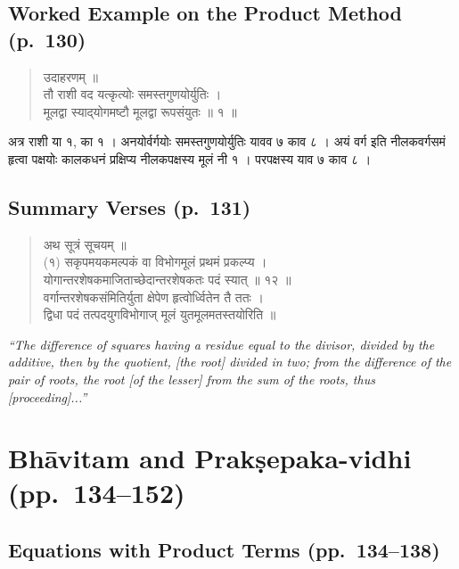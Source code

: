 \documentclass[11pt,a4paper]{article}
\newcommand{\cnote}[1]{\textcolor{notecolor}{\textit{#1}}}
\newcommand{\dev}[1]{{\devanagarifont #1}}
\newenvironment{sanskritverse}{%
  \begin{quote}
}{%
  \end{quote}
}
\begin{document}
\subsection*{Worked Example on the Product Method (p.\ 130)}

\begin{sanskritverse}
\dev{%
उदाहरणम् ॥\\[0.3em]
तौ राशी वद यत्कृत्योः समस्तगुणयोर्युतिः ।\\
मूलद्वा स्याद्‌योगमष्टौ मूलद्वा रूपसंयुतः ॥ १ ॥}
\end{sanskritverse}

\dev{%
अत्र राशी या १, का १ । अनयोर्वर्गयोः समस्तगुणयोर्युतिः यावव ७ काव ८ । अयं वर्ग इति नीलकवर्गसमं हृत्वा पक्षयोः कालकधनं प्रक्षिप्य नीलकपक्षस्य मूलं नी १ । परपक्षस्य याव ७ काव ८ ।}

\subsection*{Summary Verses (p.\ 131)}

\begin{sanskritverse}
\dev{%
अथ सूत्रं सूचयम् ॥\\[0.5em]
(१) सकृपमयकमल्पकं वा विभोगमूलं प्रथमं प्रकल्प्य ।\\
योगान्तरशेषकमाजिताच्छेदान्तरशेषकतः पदं स्यात् ॥ १२ ॥\\[0.5em]
वर्गान्तरशेषकसंमितिर्युता क्षेपेण हृत्वोर्ध्वितेन तै ततः ।\\
द्विधा पदं तत्पदयुगविभोगाज् मूलं युतमूलमतस्तयोरिति ॥}
\end{sanskritverse}

\cnote{``The difference of squares having a residue equal to the divisor, divided by the additive, then by the quotient, [the root] divided in two; from the difference of the pair of roots, the root [of the lesser] from the sum of the roots, thus [proceeding]...''}

\section{Bhāvitam and Prakṣepaka-vidhi (pp.\ 134--152)}
\label{sec:bhavitam}

\subsection{Equations with Product Terms (pp.\ 134--138)}
\end{document}
